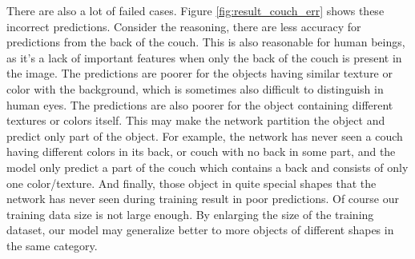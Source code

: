 There are also a lot of failed cases. Figure \ref{fig:result_couch_err} shows these incorrect predictions. Consider the reasoning, there are less accuracy for predictions from the back of the couch. This is also reasonable for human beings, as it's a lack of important features when only the back of the couch is present in the image. The predictions are poorer for the objects having similar texture or color with the background, which is sometimes also difficult to distinguish in human eyes. The predictions are also poorer for the object containing different textures or colors itself. This may make the network partition the object and predict only part of the object. For example, the network has never seen a couch having different colors in its back, or couch with no back in some part, and the model only predict a part of the couch which contains  a back and consists of only one color/texture. And finally, those object in quite special shapes that the network has never seen during training result in poor predictions. Of course our training data size is not large enough. By enlarging the size of the training dataset, our model  may generalize better to more objects of different shapes in the same category.

